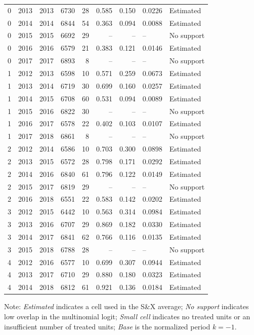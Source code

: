 \begin{longtable}{rrrrrrrll}
0 & 2013 & 2013 & 6730 & 28 & 0.585 & 0.150 & 0.0226 & Estimated \\
0 & 2014 & 2014 & 6844 & 54 & 0.363 & 0.094 & 0.0088 & Estimated \\
0 & 2015 & 2015 & 6692 & 29 & -- & -- & -- & No support \\
0 & 2016 & 2016 & 6579 & 21 & 0.383 & 0.121 & 0.0146 & Estimated \\
0 & 2017 & 2017 & 6893 & 8 & -- & -- & -- & No support \\
1 & 2012 & 2013 & 6598 & 10 & 0.571 & 0.259 & 0.0673 & Estimated \\
1 & 2013 & 2014 & 6719 & 30 & 0.699 & 0.160 & 0.0257 & Estimated \\
1 & 2014 & 2015 & 6708 & 60 & 0.531 & 0.094 & 0.0089 & Estimated \\
1 & 2015 & 2016 & 6822 & 30 & -- & -- & -- & No support \\
1 & 2016 & 2017 & 6578 & 22 & 0.402 & 0.103 & 0.0107 & Estimated \\
1 & 2017 & 2018 & 6861 & 8 & -- & -- & -- & No support \\
2 & 2012 & 2014 & 6586 & 10 & 0.703 & 0.300 & 0.0898 & Estimated \\
2 & 2013 & 2015 & 6572 & 28 & 0.798 & 0.171 & 0.0292 & Estimated \\
2 & 2014 & 2016 & 6840 & 61 & 0.796 & 0.122 & 0.0149 & Estimated \\
2 & 2015 & 2017 & 6819 & 29 & -- & -- & -- & No support \\
2 & 2016 & 2018 & 6551 & 22 & 0.583 & 0.142 & 0.0202 & Estimated \\
3 & 2012 & 2015 & 6442 & 10 & 0.563 & 0.314 & 0.0984 & Estimated \\
3 & 2013 & 2016 & 6707 & 29 & 0.869 & 0.182 & 0.0330 & Estimated \\
3 & 2014 & 2017 & 6841 & 62 & 0.766 & 0.116 & 0.0135 & Estimated \\
3 & 2015 & 2018 & 6788 & 28 & -- & -- & -- & No support \\
4 & 2012 & 2016 & 6577 & 10 & 0.699 & 0.307 & 0.0944 & Estimated \\
4 & 2013 & 2017 & 6710 & 29 & 0.880 & 0.180 & 0.0323 & Estimated \\
4 & 2014 & 2018 & 6812 & 61 & 0.921 & 0.136 & 0.0184 & Estimated \\
\end{longtable}
\vspace{-0.35cm}
\noindent\footnotesize Note: \textit{Estimated} indicates a cell used in the S\&X average; \textit{No support} indicates low overlap in the multinomial logit; \textit{Small cell} indicates no treated units or an insufficient number of treated units; \textit{Base} is the normalized period \(k=-1\).
\par\endgroup



